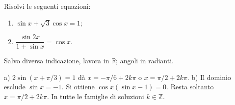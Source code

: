 
\begin{esercizio}
Risolvi le seguenti equazioni: 

\begin{enumerate}
\item $\displaystyle \sin x+\sqrt{3}\cos x=1;$

\item $\displaystyle \dfrac{\sin 2x}{1+\sin x}=\cos x.$
\end{enumerate}
Salvo diversa indicazione, lavora in $\mathbb R$; angoli in radianti.
\end{esercizio}

\begin{soluzione}
a) $2\sin(x+\pi/3)=1$ dà $x=-\pi/6+2k\pi$ o $x=\pi/2+2k\pi$.
b) Il dominio esclude $\sin x=-1$. Si ottiene $\cos x(\sin x-1)=0$.
Resta soltanto $x=\pi/2+2k\pi$. In tutte le famiglie di soluzioni $k\in\mathbb{Z}$.
\end{soluzione}
